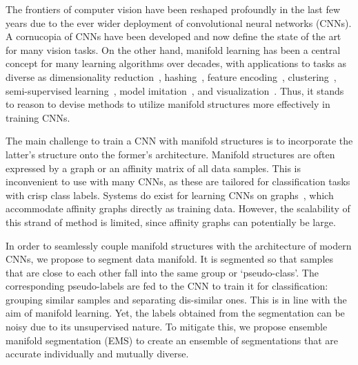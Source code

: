 \documentclass{bmvc2k}
\begin{document}
The frontiers of computer vision have been reshaped profoundly in the
last few years due to the ever wider deployment of convolutional neural networks
(CNNs). A cornucopia of CNNs have been developed and now define the
state of the art for many vision tasks. On the other hand, manifold learning has been a central
concept for many learning algorithms over decades, with
applications to tasks as diverse as dimensionality
reduction~\cite{lle:science:00,isomap},
hashing~\cite{manifold:hashing}, 
feature encoding~\cite{siftllc:CVPR10},
clustering~\cite{manifold:clustering,sparse:manifold:clustering},
semi-supervised learning~\cite{Belkin:semiframe:2006}, 
model imitation~\cite{dai:metric:imitation}, and
visualization~\cite{manifold:visualizing}. 
Thus, it stands to reason to devise methods to  utilize manifold structures more effectively in training CNNs. 

The main challenge to train a CNN with manifold structures is to incorporate
the latter's structure onto the former's architecture. Manifold structures are often
expressed by a graph or an affinity matrix of all data samples. This is inconvenient to use with many CNNs, as these are tailored for classification tasks with crisp class labels. Systems do exist for learning CNNs on graphs~\cite{bruna2013spectral,cnn:graph, learning:cnn:graph}, which accommodate affinity graphs directly as training data. However, the scalability of this strand of method is limited, since affinity graphs can potentially be large. 


In order to seamlessly couple manifold structures with the architecture
of modern CNNs, we propose to segment data manifold. It is segmented so 
that samples that are close to each other fall into the same group or 
`pseudo-class'. The corresponding pseudo-labels are fed to the CNN to 
train it for classification: grouping similar samples and separating 
dis-similar ones. This is in line with the aim of manifold learning. 
Yet, the labels obtained from the segmentation can be noisy 
due to its unsupervised nature. To mitigate this, 
we propose ensemble manifold segmentation (EMS) to create an ensemble of segmentations that are accurate individually and mutually diverse. 
\end{document}

